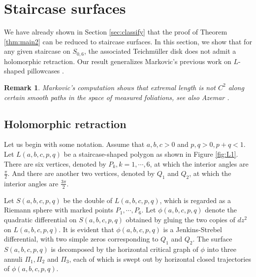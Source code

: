 \documentclass[11pt]{amsart}
\theoremstyle{plain}
\newtheorem{Remark}{Remark}
\begin{document}
\section{Staircase surfaces} \label{sec:computation}
\noindent

We have already shown in Section \ref{sec:classify}  that
the proof of Theorem \ref{thm:main2} can be reduced to staircase surfaces. 
In this section, we  show that for any  given staircase on $S_{0,6}$, the associated Teichm\"uller disk does not
admit a holomorphic retraction. 
Our result generalizes Markovic's previous work on $L$-shaped pillowcases \cite{Markovic2018}. 


\begin{Remark}
  Markovic's computation shows that extremal length is not $C^2$ along certain smooth paths in  the space of measured foliations, see also Azemar \cite[Theorem 1.9]{Azemar}.
\end{Remark}


\subsection{Holomorphic retraction}\label{sec:area}

Let us begin with some notation. Assume that $a, b, c>0$ and $p,q>0, p+q<1$.
 Let $L(a,b,c,p,q)$ be a staircase-shaped polygon as shown in Figure \ref{fig:L1}.
 There are six vertices, denoted by
 $P_k, k=1, \cdots,6$, at which the interior angles are $\frac{\pi}{2}$. And there are another two vertices, denoted by $Q_1$ and $Q_2$, at which the interior angles are $\frac{3\pi}{2}$.


 Let $S(a,b,c,p,q)$ be the double of  $L(a,b,c,p,q)$,
  which is regarded as a Riemann sphere with  marked points $P_1, \cdots, P_6$.
Let $\phi(a,b,c,p,q)$ denote the quadratic differential on $S(a,b,c,p,q)$ obtained by 
gluing the two copies of $dz^2$ on $L(a,b,c,p,q)$. 
It is evident that $\phi(a,b,c,p,q)$ is a Jenkins-Strebel differential,
 with two simple zeros corresponding to $Q_1$ and  $Q_2$. The surface $S(a,b,c,p,q)$ is decomposed 
 by the horizontal critical graph of $\phi$ into three annuli $\Pi_1,\Pi_2$ and 
$\Pi_3$, each of which is swept out by horizontal closed  trajectories of $\phi(a,b,c,p,q)$.
\end{document}
